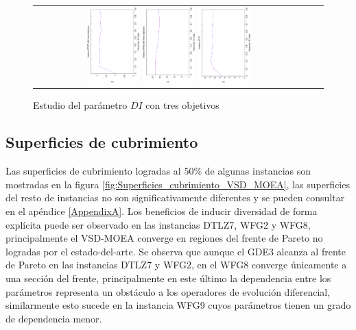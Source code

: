 \begin{figure}[H]
\centering
\caption{Estudio del parámetro $DI$ con tres objetivos}
\label{fig:Parametrization_3}
\begin{tabular}{ccc}
   \includegraphics[width=0.2\textwidth, angle=-90,origin=c]{Figures_Chapter7/Results_Chapter3/EPS_DI/3obj_DTLZ7.eps}
   \includegraphics[width=0.2\textwidth,angle=-90,origin=c]{Figures_Chapter7/Results_Chapter3/EPS_DI/3obj_WFG9.eps}
   \includegraphics[width=0.2\textwidth,angle=-90,origin=c]{Figures_Chapter7/Results_Chapter3/EPS_DI/UF10.eps}
\end{tabular}
\end{figure}


\subsection{Superficies de cubrimiento}

Las superficies de cubrimiento logradas al $50\%$ de algunas instancias son mostradas en la figura \ref{fig:Superficies_cubrimiento_VSD_MOEA}, las superficies del resto de instancias no son significativamente diferentes y se pueden consultar en el apéndice \ref{AppendixA}.
%
Los beneficios de inducir diversidad de forma explícita puede ser observado en las instancias DTLZ7, WFG2 y WFG8, principalmente el VSD-MOEA converge en regiones del frente de Pareto no logradas por el estado-del-arte.
%
Se observa que aunque el GDE3 alcanza al frente de Pareto en las instancias DTLZ7 y WFG2, en el WFG8 converge únicamente a una sección del frente, principalmente en este último la dependencia entre los parámetros representa un obstáculo a los operadores de evolución diferencial, similarmente esto sucede en la instancia WFG9 cuyos parámetros tienen un grado de dependencia menor.
%

